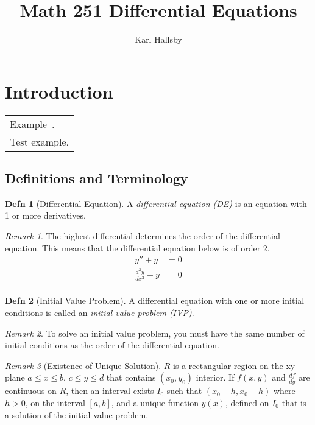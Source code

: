 \documentclass[10pt,letterpaper,final,twoside,notitlepage]{article}
\author{Karl Hallsby}
\title{Math 251 Differential Equations}
\theoremstyle{plain}
\theoremstyle{definition}
\newtheorem{definition}{Defn}
\theoremstyle{remark}
\newtheorem{remark}{Remark}[definition]
\newcounter{example}[section]
\newenvironment{example} %
	{\refstepcounter{example} \begin{center}\begin{tabular}{|p{0.9\textwidth}|} \hline Example~\theexample.  \\ }
	{\\ \hline \end{tabular} \end{center}}
\begin{document}
\section{Introduction} \label{sec:Introduction}
	\begin{example}
		Test example.
	\end{example}
	\subsection{Definitions and Terminology} \label{subsec:Definitions and Terminology}
		\begin{definition}[Differential Equation] \label{def:Differential Equation}
			A \emph{differential equation (DE)} is an equation with 1 or more derivatives.
			\begin{remark}
				The highest differential determines the order of the differential equation.
				This means that the differential equation below is of order 2.
				\begin{align*} 
					y'' + y &= 0 \\
					\frac{d^{2}y}{dx^{2}} + y &= 0 \\
				\end{align*} 
			\end{remark}
		\end{definition}
		\begin{definition}[Initial Value Problem] \label{def:Initial Value Problem}
			A differential equation with one or more initial conditions is called an \emph{initial value problem (IVP)}.
			\begin{remark}
				To solve an initial value problem, you must have the same number of initial conditions as the order of the differential equation.
			\end{remark}
			\begin{remark}[Existence of Unique Solution]
				$R$ is a rectangular region on the xy-plane $a \leq x \leq b$, $c \leq y \leq d$ that contains $\left( x_{0}, y_{0} \right)$ interior.
				If $f \left( x,y \right)$ and $\frac{df}{dy}$ are continuous on $R$, then an interval exists $I_{0}$ such that $\left( x_{0}-h, x_{0}+h \right)$ where $h>0$, on the interval $\left[ a,b \right]$, and a unique function $y \left( x \right)$, defined on $I_{0}$ that is a solution of the initial value problem.
			\end{remark}
		\end{definition}
	
\end{document}
